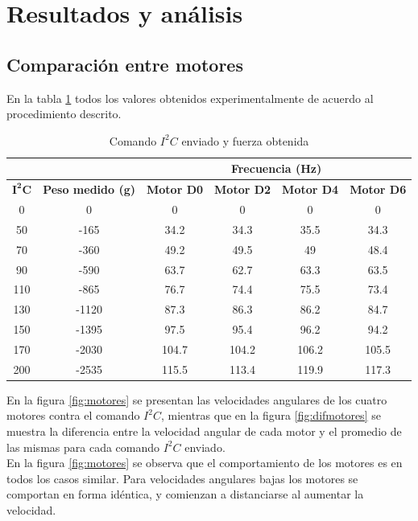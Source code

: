 \documentclass[main]{subfiles}
\begin{document}
\section{Resultados y an\'alisis}

\subsection{Comparaci\'on entre motores}
\label{sec:motores} 

En la tabla \ref{tab:motores} todos los valores obtenidos experimentalmente de acuerdo al procedimiento descrito. 


\begin{table}[H]
\centering
\begin{tabular}{|c|c|c|c|c|c|} 
	\cline{3-6} \multicolumn{1}{c}{} & \multicolumn{1}{c}{} & 
	\multicolumn{4}{|c|}{\cellcolor[gray]{0.6}Frecuencia (Hz)} \\ \hline
	\cellcolor[gray]{0.8} {$\mathbf{I^2C}$} & 
	\cellcolor[gray]{0.8} \textbf{Peso medido (g)} &
	\cellcolor[gray]{0.8} \textbf{Motor D0} &
	\cellcolor[gray]{0.8} \textbf{Motor D2} &
	\cellcolor[gray]{0.8} \textbf{Motor D4} &
	\cellcolor[gray]{0.8} \textbf{Motor D6}   \\ \hline \hline
	  0 &      0 &    0 &    0 &    0 &    0 \\ \hline
	 50 &-165 & 34.2 & 34.3 & 35.5 & 34.3 \\ \hline
	 70 &-360 & 49.2 & 49.5 &   49 & 48.4 \\ \hline
	 90 & -590 & 63.7 & 62.7 & 63.3 & 63.5 \\ \hline
	110 & -865 & 76.7 & 74.4 & 75.5 & 73.4 \\ \hline
	130 &  -1120 & 87.3 & 86.3 & 86.2 & 84.7 \\ \hline
	150 & -1395 & 97.5 & 95.4 & 96.2 & 94.2 \\ \hline
	170 & -2030 &104.7 &104.2 &106.2 &105.5 \\ \hline
	200 & -2535 &115.5 &113.4 &119.9 &117.3 \\ \hline
\end{tabular}
\caption{Comando $I^2C$ enviado y fuerza obtenida}
\label{tab:motores}
\end{table}

En la figura \ref{fig:motores} se presentan las velocidades angulares de los cuatro motores contra el comando $I^2C$, mientras que en la figura \ref{fig:difmotores} se muestra la diferencia entre la velocidad angular de cada motor y el promedio de las mismas para cada comando $I^2C$ enviado.\\
En la figura \ref{fig:motores} se observa que el comportamiento de los motores es en todos los casos similar. Para velocidades angulares bajas los motores se comportan en forma id\'entica, y comienzan a distanciarse al aumentar la velocidad.\\
 
\end{document}
